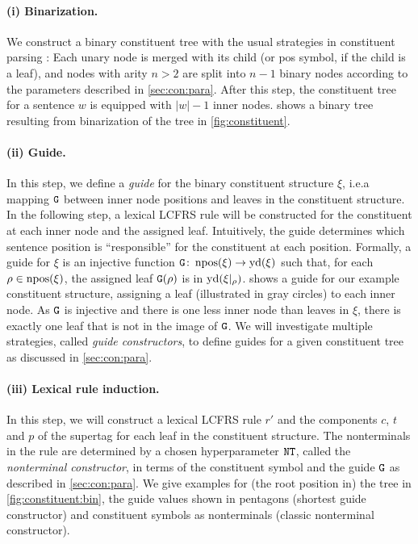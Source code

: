 \documentclass[../../document.tex]{subfiles}
\begin{document}
    \paragraph{(i) Binarization.}
    We construct a binary constituent tree with the usual strategies in constituent parsing \cite{KalMai13}:
    Each unary node is merged with its child (or pos symbol, if the child is a leaf), and nodes with arity \(n>2\) are split into \(n-1\) binary nodes according to the parameters described in \cref{sec:con:para}.
    After this step, the constituent tree for a sentence \(w\) is equipped with \(|w|-1\) inner nodes.
     shows a binary tree resulting from binarization of the tree in \cref{fig:constituent}.

    \paragraph{(ii) Guide.}
    In this step, we define a \emph{guide} for the binary constituent structure \(\xi\), i.e.\@ a mapping \(\texttt{G}\) between inner node positions and leaves in the constituent structure.
    In the following step, a lexical LCFRS rule will be constructed for the constituent at each inner node and the assigned leaf.
    Intuitively, the guide determines which sentence position is ``responsible'' for the constituent at each position.
    Formally, a guide for \(\xi\) is an injective function \(\texttt{G}\colon \operatorname{npos}(\xi) \to \operatorname{yd}(\xi)\) such that, for each \(\rho \in \operatorname{npos}(\xi)\), the assigned leaf \(\texttt{G}(\rho)\) is in \(\operatorname{yd}(\xi|_\rho)\).
     shows a guide for our example constituent structure, assigning a leaf (illustrated in gray circles) to each inner node.
    As \(\texttt{G}\) is injective and there is one less inner node than leaves in \(\xi\), there is exactly one leaf that is not in the image of \(\texttt{G}\).
    We will investigate multiple strategies, called \emph{guide constructors}, to define guides for a given constituent tree as discussed in \cref{sec:con:para}.

    \paragraph{(iii) Lexical rule induction.}
    In this step, we will construct a lexical LCFRS rule \(r'\) and the components \(c\), \(t\) and \(p\) of the supertag for each leaf in the constituent structure.
    The nonterminals in the rule are determined by a chosen hyperparameter \(\texttt{NT}\), called the \emph{nonterminal constructor}, in terms of the constituent symbol and the guide \(\texttt{G}\) as described in \cref{sec:con:para}.
    We give examples for (the root position in) the tree in \cref{fig:constituent:bin}, the guide values shown in pentagons (shortest guide constructor) and constituent symbols as nonterminals (classic nonterminal constructor).
\end{document}
